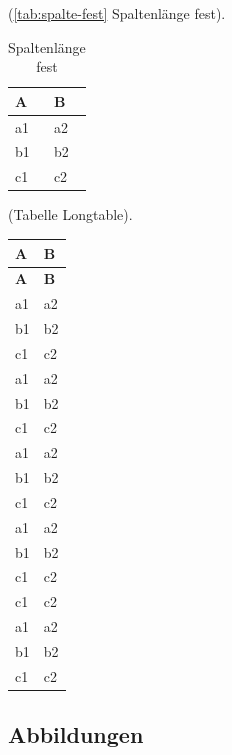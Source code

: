 (\autoref{tab:spalte-fest} Spaltenlänge fest).
\begin{table}[!hb] %
	\centering
	\setlength{\tabcolsep}{5mm}%
	\begin{tabular} {ll}
		\toprule 
	    \textbf{A} & \textbf{B} \\
	  \midrule
			a1 & a2 \\
			b1 & b2 \\
			c1 & c2 \\
		\bottomrule
	\end{tabular}
	\caption{Spaltenlänge fest}%
	\label{tab:spalte-fest}					  %
\end{table}

(Tabelle Longtable).
\begin{longtable}{ll}%
	\toprule
	\textbf{A} & \textbf{B} \\
	\midrule
	\endfirsthead
	\toprule
	\textbf{A} & \textbf{B} \\
	\midrule
	\endhead
	a1 & a2 \\
	b1 & b2 \\
	c1 & c2 \\
	a1 & a2 \\
	b1 & b2 \\
	c1 & c2 \\
	a1 & a2 \\
	b1 & b2 \\
	c1 & c2 \\
	a1 & a2 \\
	b1 & b2 \\
	c1 & c2 \\
	c1 & c2 \\
	a1 & a2 \\
	b1 & b2 \\
	c1 & c2 \\
	\bottomrule
\end{longtable}

\newpage

\subsection{Abbildungen}\label{sec:abbildungen}

